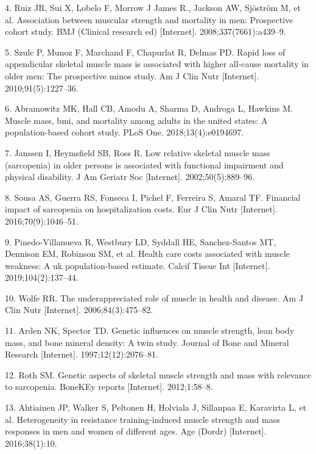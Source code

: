 \documentclass[twoside,10pt]{gihclass} %
\begin{document}
\leavevmode\hypertarget{ref-RN2376}{}%
4. Ruiz JR, Sui X, Lobelo F, Morrow J James R., Jackson AW, Sjöström M, et al. Association between muscular strength and mortality in men: Prospective cohort study. BMJ (Clinical research ed) {[}Internet{]}. 2008;337(7661):a439--9.

\leavevmode\hypertarget{ref-RN2515}{}%
5. Szulc P, Munoz F, Marchand F, Chapurlat R, Delmas PD. Rapid loss of appendicular skeletal muscle mass is associated with higher all-cause mortality in older men: The prospective minos study. Am J Clin Nutr {[}Internet{]}. 2010;91(5):1227--36.

\leavevmode\hypertarget{ref-RN2516}{}%
6. Abramowitz MK, Hall CB, Amodu A, Sharma D, Androga L, Hawkins M. Muscle mass, bmi, and mortality among adults in the united states: A population-based cohort study. PLoS One. 2018;13(4):e0194697.

\leavevmode\hypertarget{ref-RN2517}{}%
7. Janssen I, Heymsfield SB, Ross R. Low relative skeletal muscle mass (sarcopenia) in older persons is associated with functional impairment and physical disability. J Am Geriatr Soc {[}Internet{]}. 2002;50(5):889--96.

\leavevmode\hypertarget{ref-RN2532}{}%
8. Sousa AS, Guerra RS, Fonseca I, Pichel F, Ferreira S, Amaral TF. Financial impact of sarcopenia on hospitalization costs. Eur J Clin Nutr {[}Internet{]}. 2016;70(9):1046--51.

\leavevmode\hypertarget{ref-RN2184}{}%
9. Pinedo-Villanueva R, Westbury LD, Syddall HE, Sanchez-Santos MT, Dennison EM, Robinson SM, et al. Health care costs associated with muscle weakness: A uk population-based estimate. Calcif Tissue Int {[}Internet{]}. 2019;104(2):137--44.

\leavevmode\hypertarget{ref-RN763}{}%
10. Wolfe RR. The underappreciated role of muscle in health and disease. Am J Clin Nutr {[}Internet{]}. 2006;84(3):475--82.

\leavevmode\hypertarget{ref-RN2526}{}%
11. Arden NK, Spector TD. Genetic influences on muscle strength, lean body mass, and bone mineral density: A twin study. Journal of Bone and Mineral Research {[}Internet{]}. 1997;12(12):2076--81.

\leavevmode\hypertarget{ref-RN2527}{}%
12. Roth SM. Genetic aspects of skeletal muscle strength and mass with relevance to sarcopenia. BoneKEy reports {[}Internet{]}. 2012;1:58--8.

\leavevmode\hypertarget{ref-RN1741}{}%
13. Ahtiainen JP, Walker S, Peltonen H, Holviala J, Sillanpaa E, Karavirta L, et al. Heterogeneity in resistance training-induced muscle strength and mass responses in men and women of different ages. Age (Dordr) {[}Internet{]}. 2016;38(1):10.
\end{document}
